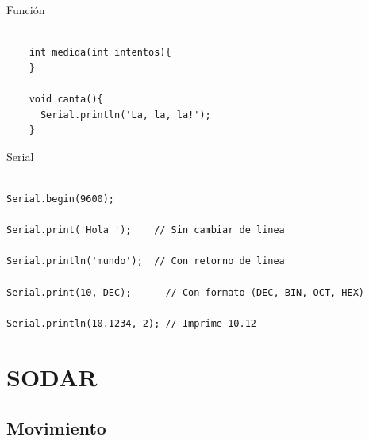 \begin{frame}[fragile]{Función}
  \begin{lstlisting}

    int medida(int intentos){
    }

    void canta(){
      Serial.println('La, la, la!');
    }

  \end{lstlisting}
\end{frame}

\begin{frame}[fragile]{Serial}
  \begin{lstlisting}

Serial.begin(9600);

Serial.print('Hola ');    // Sin cambiar de linea

Serial.println('mundo');  // Con retorno de linea 

Serial.print(10, DEC);      // Con formato (DEC, BIN, OCT, HEX)

Serial.println(10.1234, 2); // Imprime 10.12

  \end{lstlisting}
\end{frame}

\section{SODAR}

\subsection{Movimiento}

